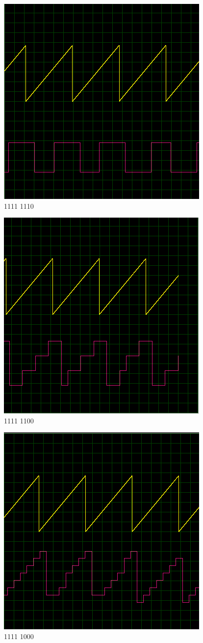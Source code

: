 \begin{multicols}{2}
\begin{figure}[H]
\centering
\includegraphics[width=0.5\linewidth]{ImagenesEjercicio1/bit1.png}
\caption{1111 1110}
\end{figure}
\begin{figure}[H]
\centering
\includegraphics[width=0.5\linewidth]{ImagenesEjercicio1/bit2.png}
\caption{1111 1100}
\end{figure}
\begin{figure}[H]
\centering
\includegraphics[width=0.5\linewidth]{ImagenesEjercicio1/bit3.png}
\caption{1111 1000}
\end{figure}

\end{multicols}
